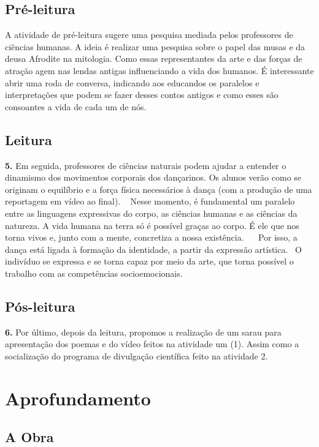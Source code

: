 \documentclass[12pt]{extarticle}
\begin{document}
\subsection{Pré-leitura}

 A atividade de pré-leitura sugere uma pesquisa mediada pelos professores de
 ciências humanas. A ideia é realizar uma pesquisa sobre o papel das musas e da
 deusa Afrodite na mitologia. Como essas representantes da arte e das forças de
 atração agem nas lendas antigas influenciando a vida dos humanos. É
 interessante abrir uma roda de conversa, indicando aos educandos os paralelos
 e interpretações que podem se fazer desses contos antigos e como esses são
 consoantes a vida de cada um de nós.


 
\subsection{Leitura}

\textbf{5.} Em seguida, professores de ciências naturais podem ajudar a
entender o dinamismo dos movimentos corporais dos dançarinos. Os alunos verão
como se originam o equilíbrio e a força física necessários à dança (com a
produção de uma reportagem em vídeo ao final).    Nesse momento, é fundamental
um paralelo entre as linguagens expressivas do corpo, as ciências humanas e as
ciências da natureza. A vida humana na terra só é possível graças ao corpo. É
ele que nos torna vivos e, junto com a mente, concretiza a nossa existência.   
Por isso, a dança está ligada à formação da identidade, a partir da expressão
artística.  O indivíduo se expressa e se torna capaz por meio da arte, que
torna possível o trabalho com as competências socioemocionais.


\subsection{Pós-leitura}

\textbf{6.} Por último, depois da leitura, propomos a realização de um sarau
para apresentação dos poemas e do vídeo feitos na atividade um (1). Assim como
a socialização do programa de divulgação científica feito na atividade 2.

\section{Aprofundamento}


\subsection{A Obra}
\end{document}
